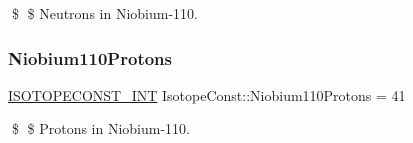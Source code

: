 \$ \$ Neutrons in Niobium-\/110. \mbox{\label{group___isotope_const-_niobium-_nb110_gae5e9271a5b839be1089a43f9c3584893}} 
\subsubsection{\texorpdfstring{Niobium110\+Protons}{Niobium110Protons}}
{\footnotesize\ttfamily \mbox{\hyperlink{group___isotope_const-_macros_ga5f18360b3e99483a35c32d789e62621c}{I\+S\+O\+T\+O\+P\+E\+C\+O\+N\+S\+T\+\_\+\+I\+NT}} Isotope\+Const\+::\+Niobium110\+Protons = 41}

\$ \$ Protons in Niobium-\/110. 
